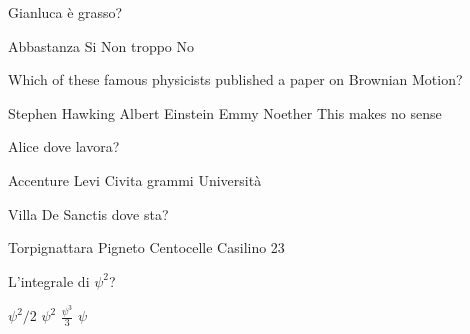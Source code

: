 \documentclass{exam}
\begin{document}
\begin{center}
\end{center}
\vspace{5mm}
\vspace{5mm}
\vspace{5mm}
\begin{questions}
\question[10] Gianluca è grasso?
\begin{choices}
\choice Abbastanza
\choice Si
\choice Non troppo
\choice No
\end{choices}
\question[10] Which of these famous physicists published a paper on Brownian Motion?
\begin{choices}
\choice Stephen Hawking 
\choice Albert Einstein
\choice Emmy Noether
\choice This makes no sense
\end{choices}
\question[10] Alice dove lavora?
\begin{choices}
\choice Accenture
\choice Levi Civita
 grammi
\choice Università
\end{choices}
\question[10] Villa De Sanctis dove sta?
\begin{choices}
\choice Torpignattara
\choice Pigneto
\choice Centocelle
\choice Casilino 23
\end{choices}
\question[10] L'integrale di $\psi^{2}$?
\begin{choices}
\choice $\psi^{2}/2$
\choice $\psi^{2}$
\choice $\frac{\psi^{3}}{3}$
\choice $\psi$
\end{choices}
\end{questions}
           
\end{document}
